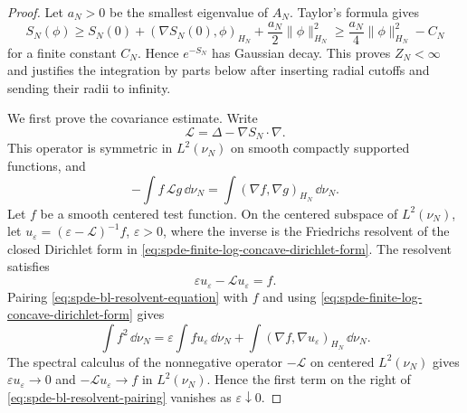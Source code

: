 \begin{proof}
Let \(a_N>0\) be the smallest eigenvalue of \(A_N\).  Taylor's formula gives
\[
  S_N(\phi)
  \geq
  S_N(0)+(\nabla S_N(0),\phi)_{H_N}
  +\frac{a_N}{2}\|\phi\|_{H_N}^2
  \geq
  \frac{a_N}{4}\|\phi\|_{H_N}^2-C_N
\]
for a finite constant \(C_N\).  Hence \(e^{-S_N}\) has Gaussian decay.
This proves \(Z_N<\infty\) and justifies the integration by parts below
after inserting radial cutoffs and sending their radii to infinity.

We first prove the covariance estimate.  Write
\[
  \mathcal L=\Delta-\nabla S_N\cdot\nabla .
\]
This operator is symmetric in \(L^2(\nu_N)\) on smooth compactly supported
functions, and
\begin{equation}
  -\int f\,\mathcal Lg\,\dd\nu_N
  =
  \int(\nabla f,\nabla g)_{H_N}\,\dd\nu_N .
  \label{eq:spde-finite-log-concave-dirichlet-form}
\end{equation}
Let \(f\) be a smooth centered test function.  On the centered subspace of
\(L^2(\nu_N)\), let \(u_\varepsilon=(\varepsilon-\mathcal L)^{-1}f\),
\(\varepsilon>0\), where the inverse is the Friedrichs resolvent of the
closed Dirichlet form in
\eqref{eq:spde-finite-log-concave-dirichlet-form}.  The resolvent satisfies
\begin{equation}
  \varepsilon u_\varepsilon-\mathcal L u_\varepsilon=f .
  \label{eq:spde-bl-resolvent-equation}
\end{equation}
Pairing \eqref{eq:spde-bl-resolvent-equation} with \(f\) and using
\eqref{eq:spde-finite-log-concave-dirichlet-form} gives
\begin{equation}
  \int f^2\,\dd\nu_N
  =
  \varepsilon\int fu_\varepsilon\,\dd\nu_N
  +
  \int(\nabla f,\nabla u_\varepsilon)_{H_N}\,\dd\nu_N .
  \label{eq:spde-bl-resolvent-pairing}
\end{equation}
The spectral calculus of the nonnegative operator
\(-\mathcal L\) on centered \(L^2(\nu_N)\) gives
\(\varepsilon u_\varepsilon\to0\) and
\(-\mathcal L u_\varepsilon\to f\) in \(L^2(\nu_N)\).  Hence the first term
on the right of \eqref{eq:spde-bl-resolvent-pairing} vanishes as
\(\varepsilon\downarrow0\).


\end{proof}
